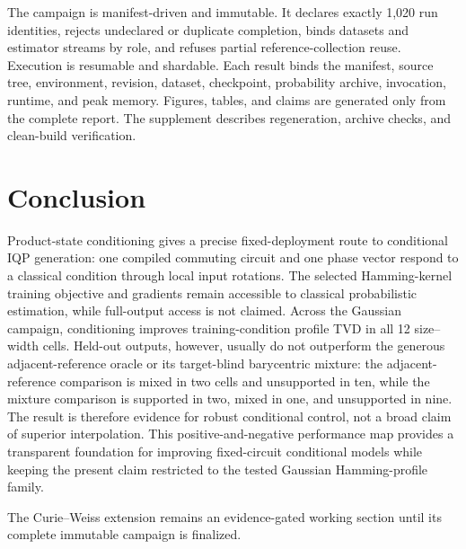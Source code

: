 \documentclass[a4paper,twocolumn,11pt,unpublished]{quantumarticle}
\newif\ifcurieweissresults
\begin{document}
The campaign is manifest-driven and immutable.  It declares exactly 1,020 run
identities, rejects undeclared or duplicate completion, binds datasets and
estimator streams by role, and refuses partial reference-collection reuse.
Execution is resumable and shardable.  Each result binds the manifest, source tree,
environment, revision, dataset, checkpoint, probability archive, invocation,
runtime, and peak memory.  Figures, tables, and claims are generated only from
the complete report.  The supplement describes regeneration, archive checks,
and clean-build verification.

\section{Conclusion}

Product-state conditioning gives a precise fixed-deployment route to
conditional IQP generation: one compiled commuting circuit and one phase
vector respond to a classical condition through local input rotations.  The
selected Hamming-kernel training objective and gradients remain accessible to
classical probabilistic estimation, while full-output access is not claimed.
Across the Gaussian campaign, conditioning improves training-condition profile
TVD in all 12 size--width cells.  Held-out outputs, however, usually do not
outperform the generous adjacent-reference oracle or its target-blind
barycentric mixture: the adjacent-reference comparison is mixed in two cells and
unsupported in ten, while the mixture comparison is supported in two, mixed
in one, and unsupported in nine.  The result is therefore evidence for robust
conditional control, not a broad claim of superior interpolation.  This
positive-and-negative performance map provides a transparent foundation for
improving fixed-circuit conditional models while keeping the present claim
restricted to the tested Gaussian Hamming-profile family.
\ifcurieweissresults
The Curie--Weiss study shows that the same product-state mechanism can produce
a physically interpretable temperature response: it beats no conditioning at
12 and 16 spins, but not at 8.  It does not beat adjacent-temperature
references, and the unrestricted ablation shows that the proposed
two-coefficient symmetry sharing is too restrictive here.  These negative
comparisons and the critical/cold-regime errors delimit the result: this is a
conditional-generation showcase, not evidence for general thermal-state
generation.
\else
The Curie--Weiss extension remains an evidence-gated working section until its
complete immutable campaign is finalized.
\fi
\end{document}
